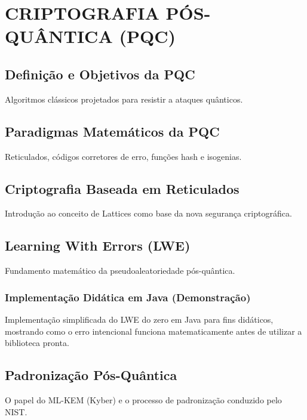 \documentclass[
	12pt,				%
	openright,			%
	oneside,			%
	a4paper,			%
	portuguese,			%
	brazil				%
	]{abntex2}
\begin{document}


\chapter{CRIPTOGRAFIA PÓS-QUÂNTICA (PQC)} %

    \section{Definição e Objetivos da PQC}

    Algoritmos clássicos projetados para resistir a ataques quânticos.

    \section{Paradigmas Matemáticos da PQC}

    Reticulados, códigos corretores de erro, funções hash e isogenias.

    \section{Criptografia Baseada em Reticulados}

    Introdução ao conceito de Lattices como base da nova segurança criptográfica.

    \section{Learning With Errors (LWE)}

    Fundamento matemático da pseudoaleatoriedade pós-quântica.

    \subsection{Implementação Didática em Java (Demonstração)}

    Implementação simplificada do LWE do zero em Java para fins didáticos, mostrando como o erro intencional funciona matematicamente antes de utilizar a biblioteca pronta.

    \section{Padronização Pós-Quântica}

    O papel do ML-KEM (Kyber) e o processo de padronização conduzido pelo NIST.
\end{document}
